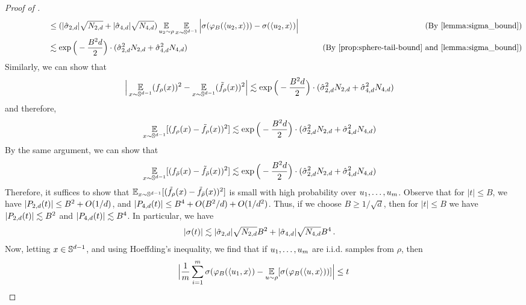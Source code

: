 \begin{proof} [Proof of ]
\begin{align}
& \nextlinespace\nextlinespace \leq (|\sigmaCoeffTwo| \sqrt{N_{2, d}} + |\sigmaCoeffFour| \sqrt{N_{4, d}}) \E_{\u_2 \sim \rho} \E_{x \sim \bbS^{d - 1}} \Big|\sigma(\truncB(\langle \u_2, x \rangle)) - \sigma(\langle \u_2, x \rangle) \Big|
& \tag{By \Cref{lemma:sigma_bound}} \\
& \nextlinespace\nextlinespace \lesssim \exp\Big(-\frac{B^2 d}{2} \Big) \cdot (\sigmaCoeffTwo^2 N_{2, d} + \sigmaCoeffFour^2 N_{4, d})
& \tag{By \Cref{prop:sphere-tail-bound} and \Cref{lemma:sigma_bound}}
\end{align}
Similarly, we can show that
\begin{align}
\Big|\operatorname*{\mathbb{E}}_{x \sim \mathbb{S}^{d - 1}} (f_\rho(x))^2 - \operatorname*{\mathbb{E}}_{x \sim \mathbb{S}^{d - 1}} (\tilde{f}_\rho(x))^2 \Big| 
& \lesssim \exp\Big(-\frac{B^2 d}{2} \Big) \cdot (\hat{\sigma}_{2, d}^2 N_{2, d} + \hat{\sigma}_{4, d}^2 N_{4, d} )
\end{align}
and therefore,
\begin{align} \label{eq:ftilde_rho_bound}
\operatorname*{\mathbb{E}}_{x \sim \mathbb{S}^{d - 1}} [(f_\rho(x) - \tilde{f}_\rho(x))^2] 
& \lesssim \exp\Big(-\frac{B^2 d}{2} \Big) \cdot (\hat{\sigma}_{2, d}^2 N_{2, d} + \hat{\sigma}_{4, d}^2 N_{4, d})
\end{align}
By the same argument, we can show that
\begin{align} \label{eq:ftilde_rhobar_bound}
\operatorname*{\mathbb{E}}_{x \sim \mathbb{S}^{d - 1}} [(f_{{\bar{\rho}}}(x) - \tilde{f}_{{\bar{\rho}}}(x))^2]
& \lesssim \exp\Big(-\frac{B^2 d}{2} \Big) \cdot (\hat{\sigma}_{2, d}^2 N_{2, d} + \hat{\sigma}_{4, d}^2 N_{4, d})
\end{align}
Therefore, it suffices to show that $\operatorname*{\mathbb{E}}_{x \sim \mathbb{S}^{d - 1}} [(\tilde{f}_\rho(x) - \tilde{f}_{{\bar{\rho}}}(x))^2]$ is small with high probability over $u_1, \ldots, u_m$. Observe that for $|t| \leq B$, we have $|{P_{2, d}}(t)| \leq B^2 + O(1/d)$, and $|{P_{4, d}}(t)| \leq B^4 + O(B^2/d) + O(1/d^2)$. Thus, if we choose $B \geq 1/\sqrt{d}$, then for $|t| \leq B$ we have $|{P_{2, d}}(t)| \lesssim B^2$ and $|{P_{4, d}}(t)| \lesssim B^4$. In particular, we have
\begin{align}
|\sigma(t)|
& \lesssim |\hat{\sigma}_{2, d}| \sqrt{N_{2, d}} B^2 + |\hat{\sigma}_{4, d}| \sqrt{N_{4, d}} B^4 \,.
\end{align}
Now, letting $x \in \mathbb{S}^{d - 1}$, and using Hoeffding's inequality, we find that if $u_1, \ldots, u_m$ are i.i.d. samples from $\rho$, then
\begin{align}
\Big| \frac{1}{m} \sum_{i = 1}^m \sigma({\varphi_B}(\langle u_1, x \rangle) - \operatorname*{\mathbb{E}}_{u \sim \rho} [\sigma({\varphi_B}(\langle u, x \rangle))] \Big| \leq t
\end{align}

\end{proof}
